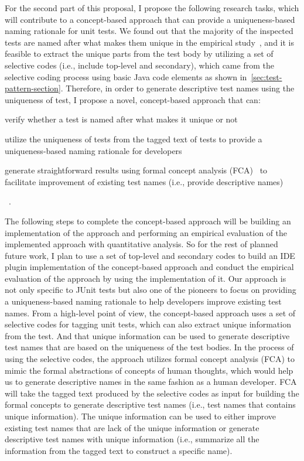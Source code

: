 For the second part of this proposal, I propose the following research tasks, which will contribute to a concept-based approach that can provide a uniqueness-based naming rationale for unit tests.
We found out that the majority of the inspected tests are named after what makes them unique in the empirical study~\cite{emp-study}, and it is feasible to extract the unique parts from the test body by utilizing a set of selective codes (i.e., include top-level and secondary), which came from the selective coding process using basic Java code elements as shown in~\cref{sec:test-pattern-section}.
%
Therefore, in order to generate descriptive test names using the uniqueness of test, I propose a novel, concept-based approach that can:
%
\begin{enumerate*}
\item verify whether a test is named after what makes it unique or not
\item utilize the uniqueness of tests from the tagged text of tests to provide a uniqueness-based naming rationale for developers
\item generate straightforward results using formal concept analysis (FCA)~\cite{ganter2012formal} to facilitate improvement of existing test names (i.e., provide descriptive names)
\end{enumerate*}~\cite{emp-study}.


The following steps to complete the concept-based approach will be building an implementation of the approach and performing an empirical evaluation of the implemented approach with quantitative analysis.
%
So for the rest of planned future work, I plan to use a set of top-level and secondary codes to build an IDE plugin implementation of the concept-based approach and conduct the empirical evaluation of the approach by using the implementation of it.
%
Our approach is not only specific to JUnit tests but also one of the pioneers to focus on providing a uniqueness-based naming rationale to help developers improve existing test names.
%
From a high-level point of view, the concept-based approach uses a set of selective codes for tagging unit tests, which can also extract unique information from the test.
%
And that unique information can be used to generate descriptive test names that are based on the uniqueness of the test bodies.
%
In the process of using the selective codes, the approach utilizes formal concept analysis (FCA) to mimic the formal abstractions of concepts of human thoughts, which would help us to generate descriptive names in the same fashion as a human developer.
%
FCA will take the tagged text produced by the selective codes as input for building the formal concepts to generate descriptive test names (i.e., test names that contains unique information).
%
The unique information can be used to either improve existing test names that are lack of the unique information or generate descriptive test names with unique information (i.e., summarize all the information from the tagged text to construct a specific name).


